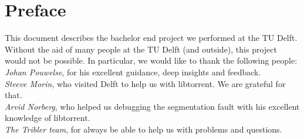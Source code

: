 \chapter*{Preface}
This document describes the bachelor end project we performed at the TU Delft. Without the aid of many people at the TU Delft (and outside), this project would not be possible. In particular, we would like to thank the following people: \\

\emph{Johan Pouwelse}, for his excellent guidance, deep insights and feedback.\\

\emph{Steeve Morin}, who visited Delft to help us with libtorrent. We are grateful for that.\\

\emph{Arvid Norberg}, who helped us debugging the segmentation fault with his excellent knowledge of libtorrent.\\

\emph{The Tribler team}, for always be able to help us with problems and questions.
